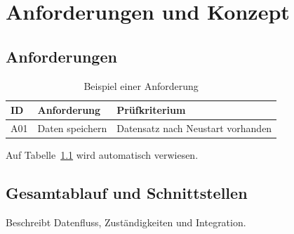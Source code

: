 \chapter{Anforderungen und Konzept}
\section{Anforderungen}
\begin{table}[htbp]
\centering
\begin{tabular}{lll}
\toprule
ID & Anforderung & Prüfkriterium \\
\midrule
A01 & Daten speichern & Datensatz nach Neustart vorhanden \\
\bottomrule
\end{tabular}
\caption{Beispiel einer Anforderung}\label{tab:anforderungen}
\end{table}
Auf Tabelle~\ref{tab:anforderungen} wird automatisch verwiesen.
\section{Gesamtablauf und Schnittstellen}
Beschreibt Datenfluss, Zuständigkeiten und Integration.

